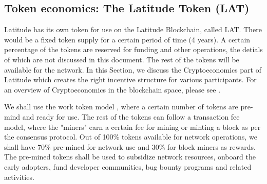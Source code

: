 \subsection{Token economics: The Latitude Token (LAT)}

Latitude has its own token for use on the Latitude Blockchain, called LAT. There would be a fixed token supply for a
certain period of time (4 years). A certain percentage of the tokens are reserved for funding and other operations, the
detials of which are not discussed in this document. The rest of the tokens will be available for the network. In this
Section, we discuss the Cryptoeconomics part of Latitude which creates the right incentive structure for various
participants.  For an overview of Cryptoeconomics in the blockchain space, please see \cite{sinclair_crypto}.

We shall use the work token model \cite{work_token}, where a certain number of tokens are pre-mind and ready for use.
The rest of the tokens can follow a transaction fee model, where the "miners" earn a certain fee for mining or minting
a block as per the consensus protocol. Out of 100\% tokens available for network operations, we shall have 70\%
pre-mined for network use and 30\% for block miners as rewards. The pre-mined tokens shall be used to subsidize network
resources, onboard the early adopters, fund developer communities, bug bounty programs and related activities.

